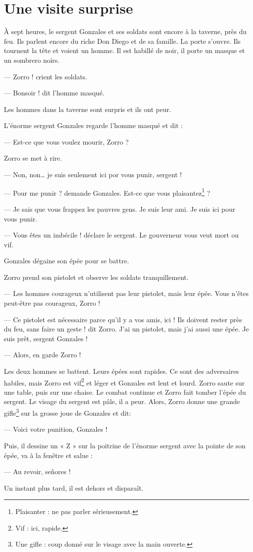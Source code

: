 \chapter{Une visite surprise}
À sept heures, le sergent Gonzales et ses soldats sont encore à la taverne, près du feu. Ils parlent encore du riche Don Diego et
de sa famille. La porte s'ouvre. Ils tournent la tête et voient un homme. Il est habillé de noir, il porte un masque et un
sombrero noirs.

--- Zorro ! crient les soldats.

--- Bonsoir ! dit l'homme masqué.

Les hommes dans la taverne sont surpris et ils ont peur.

L'énorme sergent Gonzales regarde l'homme masqué et dit :

--- Est-ce que vous voulez mourir, Zorro ?

Zorro se met à rire.

--- Non, non\ldots{} je suis seulement ici por vous punir, sergent !

--- Pour me punir ? demande Gonzales. Est-ce que vous plaisantez\footnote{Plaisanter : ne pas parler sérieusement.} ?

--- Je sais que vous frappez les pauvres gens. Je suis leur ami. Je suis ici pour vous punir.

--- Vous êtes un imbécile ! déclare le sergent. Le gouverneur vous veut mort ou vif.

Gonzales dégaine son épée pour se battre.

Zorro prend son pistolet et observe les soldats tranquillement.

--- Les hommes courageux n'utilisent pas leur pistolet, mais leur épée. Vous n'êtes peut-être pas courageux, Zorro !

--- Ce pistolet est nécessaire parce qu'il y a vos amis, ici ! Ils doivent rester près du feu, sans faire un geste ! dit Zorro.
    J'ai un pistolet, mais j'ai aussi une épée. Je suis prêt, sergent Gonzales !

--- Alors, en garde Zorro !

Les deux hommes se battent. Leurs épées sont rapides. Ce sont des adversaires habiles, mais Zorro est vif\footnote{Vif : ici,
rapide.} et léger et Gonzales est lent et lourd. Zorro saute sur une table, puis sur une chaise. Le combat continue et Zorro fait
tomber l'épée du sergent. Le visage du sergent est pâle, il a peur. Alors, Zorro donne une grande gifle\footnote{Une gifle : coup
donné sur le visage avec la main ouverte.} sur la grosse joue de Gonzales et dit:

--- Voici votre punition, Gonzales !

Puis, il dessine un « Z » sur la poitrine de l'énorme sergent avec la pointe de son épée, va à la fenêtre et salue :

--- Au revoir, señores !

Un instant plus tard, il est dehors et disparaît.
